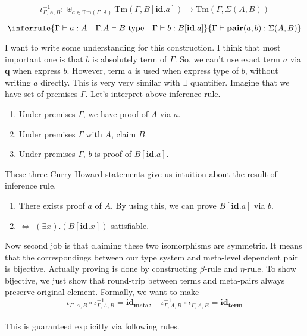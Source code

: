 \documentclass[12pt, a4paper, openany, twoside]{book}
\theoremstyle{definition}
\theoremstyle{remark}
\theoremstyle{plain}
\numberwithin{equation}{section}
\begin{document}
\begin{tcolorbox}[colback=yellow!10!white,colframe=green!75!black,title=Construction 2.2.3.]

\[\iota_{\Gamma, A, B}^{-1} : \uplus_{a \in \text{Tm}(\Gamma, A)} \text{Tm}(\Gamma, B[\textbf{id}.a]) \longrightarrow \text{Tm}(\Gamma, \Sigma(A, B))\]

\[
\inferrule
{
    \Gamma \vdash a : A \quad \Gamma.A \vdash B \text{ type} \quad \Gamma \vdash b : B[\textbf{id}.a]
}
{
    \Gamma \vdash \textbf{pair}(a, b) : \Sigma(A, B)
}
\]

\end{tcolorbox}
I want to write some understanding for this construction. I think that most important one is 
that $b$ is absolutely term of $\Gamma$. So, we can't use exact term $a$ via $\mathbf{q}$ when express $b$. 
However, term $a$ is used when express type of $b$, without writing $a$ directly. This is very very similar with 
$\exists$ quantifier. Imagine that we have set of premises $\Gamma$. Let's interpret above inference rule. 
\begin{enumerate}
    \item Under premises $\Gamma$, we have proof of $A$ via $a$. 
    \item Under premises $\Gamma$ with $A$, claim $B$. 
    \item Under premises $\Gamma$, $b$ is proof of $B[\mathbf{id}.a]$. 
\end{enumerate}
These three Curry-Howard statements give us intuition about the result of inference rule. 
\begin{enumerate}
    \item There exists proof $a$ of $A$. By using this, we can prove $B[\textbf{id}.a]$ via $b$. 
    \item $\iff$ $(\exists x).(B[\textbf{id}.x])$ satisfiable. 
\end{enumerate}
Now second job is that claiming these two isomorphisms are symmetric. It means that 
the correspondings between our type system and meta-level dependent pair is bijective. Actually 
proving is done by constructing $\beta$-rule and $\eta$-rule. To show bijective, we just show that round-trip between 
terms and meta-pairs always preserve original element. Formally, we want to make 
\[\iota_{\Gamma, A, B} \circ \iota_{\Gamma, A, B}^{-1} = \textbf{id}_{\textbf{meta}}, \quad \iota_{\Gamma, A, B}^{-1} \circ \iota_{\Gamma, A, B} = \textbf{id}_{\textbf{term}}\]
\\
This is guaranteed explicitly via following rules. 
\end{document}
